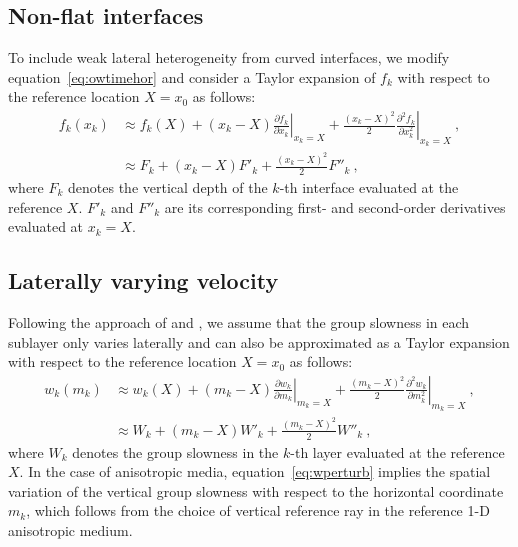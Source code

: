 \subsection{Non-flat interfaces}

To include weak lateral heterogeneity from curved interfaces, we modify equation~\ref{eq:owtimehor} and consider a Taylor expansion of $f_k$ with respect to the reference location $X=x_0$ as follows:
\begin{align}
\label{eq:fperturb}
f_k(x_k) &\approx f_k(X) + (x_k-X) \left.\frac{\partial f_k}{\partial x_k}\right\rvert_{x_k=X} + \frac{(x_k-X)^2}{2} \left.\frac{\partial^2 f_k}{\partial x_k^2}\right\rvert_{x_k=X}~, \\
\nonumber
 &\approx F_k + (x_k-X)F'_k + \frac{(x_k-X)^2 }{2}F''_k~,
\end{align}
where $F_k$ denotes the vertical depth of the $k$-th interface evaluated at the reference $X$. $F'_k$ and $F''_k$ are its corresponding first- and second-order derivatives evaluated at $x_k = X$.

\subsection{Laterally varying velocity}

Following the approach of \cite{lynnclaerbout} and \cite{grechkatsvankinlatvar}, we assume that the group slowness in each sublayer only varies laterally and can also be approximated as a Taylor expansion with respect to the reference location $X=x_0$ as follows:
\begin{align}
\label{eq:wperturb}
w_k(m_k) &\approx w_k(X) + (m_k-X) \left.\frac{\partial w_k}{\partial m_k}\right\rvert_{m_k=X} + \frac{(m_k-X)^2}{2} \left.\frac{\partial^2 w_k}{\partial m_k^2}\right\rvert_{m_k=X}~, \\
\nonumber
 &\approx W_k + (m_k-X)W'_k + \frac{(m_k-X)^2 }{2}W''_k~,
\end{align}
where $W_k$ denotes the group slowness in the $k$-th layer evaluated at the reference $X$.
In the case of anisotropic media, equation~\ref{eq:wperturb} implies the spatial variation of the vertical group slowness with respect to the horizontal coordinate $m_k$, which follows from the choice of vertical reference ray in the reference 1-D anisotropic medium.

